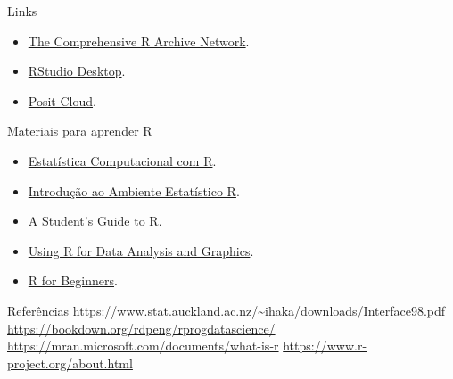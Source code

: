 \documentclass[
  ignorenonframetext,
  serif,
  professionalfont,
  usenames,
  dvipsnames,
  aspectratio = 169]{beamer}
\begin{document}
\begin{frame}{Links}
\protect\hypertarget{links}{}
\begin{itemize}
\item
  \href{https://cran.r-project.org/}{The Comprehensive R Archive
  Network}.
\item
  \href{https://posit.co/download/rstudio-desktop/}{RStudio Desktop}.
\item
  \href{https://posit.cloud/plans/free}{Posit Cloud}.
\end{itemize}
\end{frame}

\begin{frame}{Materiais para aprender R}
\protect\hypertarget{materiais-para-aprender-r}{}
\begin{itemize}
\item
  \href{http://cursos.leg.ufpr.br/ecr/}{Estatística Computacional com
  R}.
\item
  \href{http://www.leg.ufpr.br/~paulojus/embrapa/Rembrapa/}{Introdução
  ao Ambiente Estatístico R}.
\item
  \href{http://cran-r.c3sl.ufpr.br/doc/contrib/Horton+Pruim+Kaplan_MOSAIC-StudentGuide.pdf}{A
  Student's Guide to R}.
\item
  \href{http://cran-r.c3sl.ufpr.br/doc/contrib/usingR.pdf}{Using R for
  Data Analysis and Graphics}.
\item
  \href{http://cran-r.c3sl.ufpr.br/doc/contrib/Paradis-rdebuts_en.pdf}{R
  for Beginners}.
\end{itemize}
\end{frame}

\begin{frame}{Referências}
\protect\hypertarget{referuxeancias}{}
\url{https://www.stat.auckland.ac.nz/~ihaka/downloads/Interface98.pdf}
\url{https://bookdown.org/rdpeng/rprogdatascience/}
\url{https://mran.microsoft.com/documents/what-is-r}
\url{https://www.r-project.org/about.html}
\end{frame}
\end{document}
